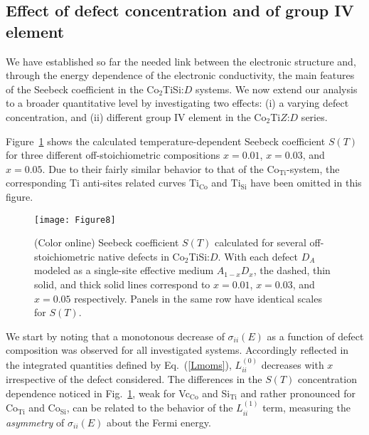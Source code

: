 \documentclass[aps,prb,twocolumn,superscriptaddress,showpacs]{revtex4}
\newcommand{\FG}[1]{Fig.~\ref{#1}}
\newcommand{\EQ}[1]{Eq.~(\ref{#1})}
\begin{document}
\subsection{Effect of defect concentration and of group 
               IV element}

We have established so far the needed link between the
electronic structure and, through the 
energy dependence of the electronic conductivity,
the main features of the Seebeck
coefficient in the Co$_2$TiSi:$D$ systems.
We now extend our analysis to a broader quantitative level
by investigating two effects: (i) a varying defect concentration,
and (ii) different group IV element in the Co$_2$Ti$Z$:$D$ series.


Figure~\ref{SEBCo2TiSiDefVarX} shows the calculated 
temperature-dependent Seebeck coefficient $S(T)$ for
three different off-stoichiometric compositions
$x=0.01$, $x=0.03$, and $x=0.05$. 
Due to their fairly similar behavior to that of the 
Co$_\text{Ti}$-system, the corresponding Ti anti-sites
related curves Ti$_\text{Co}$ and Ti$_\text{Si}$ have been
omitted in this figure. 



\begin{figure}
 \texttt{[image: Figure8]}
 \caption{(Color online) 
   Seebeck coefficient $S(T)$ calculated for
   several off-stoichiometric native defects in 
   Co$_2$TiSi:$D$. With each defect $D_A$ 
   modeled as a single-site effective 
   medium $A_{1-x}D_x$, the dashed, thin solid, and thick solid lines
   correspond to $x=0.01$, $x=0.03$, and $x=0.05$ respectively.
   Panels in the same row have identical scales for $S(T)$.}
  \label{SEBCo2TiSiDefVarX}
\end{figure}

We start by noting that a monotonous decrease of 
$\sigma_{ii}(E)$ as a function of defect composition 
was observed for all investigated systems.
Accordingly reflected in the integrated quantities
defined by \EQ{Lmoms}, $L_{ii}^{(0)}$ decreases with $x$
irrespective of the defect considered.
The differences in the $S(T)$ 
concentration dependence noticed
in \FG{SEBCo2TiSiDefVarX}, weak for 
Vc$_\text{Co}$ and Si$_\text{Ti}$ and rather pronounced
for Co$_\text{Ti}$ and Co$_\text{Si}$, can be related
to the behavior of the $L_{ii}^{(1)}$ term, 
measuring the {\em asymmetry} of $\sigma_{ii}(E)$ about the 
Fermi energy. 
\end{document}
